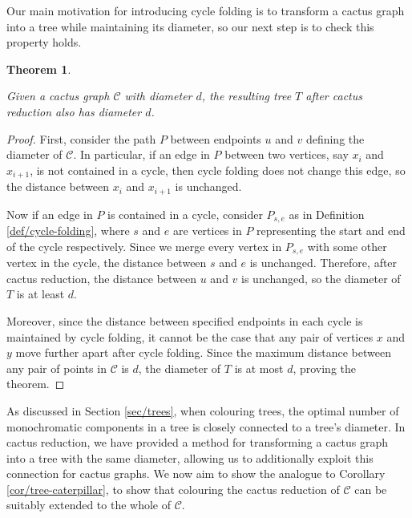\documentclass{mpaper}
\newtheorem{theorem}{Theorem}[section]
\begin{document}
Our main motivation for introducing cycle folding is to transform a cactus graph into a tree while maintaining its diameter, so our next step is to check this property holds.

\begin{theorem}
  \label{thm/cactus-reduction-diameter}

  Given a cactus graph $\mathcal{C}$ with diameter $d$, the resulting tree $T$ after cactus reduction also has diameter $d$.
\end{theorem}

\begin{proof}
  
First, consider the path $P$ between endpoints $u$ and $v$ defining the diameter of $\mathcal{C}$. In particular, if an edge in $P$ between two vertices, say $x_i$ and $x_{i+1}$, is not contained in a cycle, then cycle folding does not change this edge, so the distance between $x_i$ and $x_{i+1}$ is unchanged.

Now if an edge in $P$ is contained in a cycle, consider $P_{s,e}$ as in Definition \ref{def/cycle-folding}, where $s$ and $e$ are vertices in $P$ representing the start and end of the cycle respectively. Since we merge every vertex in $P_{s,e}$ with some other vertex in the cycle, the distance between $s$ and $e$ is unchanged. Therefore, after cactus reduction, the distance between $u$ and $v$ is unchanged, so the diameter of $T$ is at least $d$.

Moreover, since the distance between specified endpoints in each cycle is maintained by cycle folding, it cannot be the case that any pair of vertices $x$ and $y$ move further apart after cycle folding. Since the maximum distance between any pair of points in $\mathcal{C}$ is $d$, the diameter of $T$ is at most $d$, proving the theorem.
\end{proof}

As discussed in Section \ref{sec/trees}, when colouring trees, the optimal number of monochromatic components in a tree is closely connected to a tree's diameter. In cactus reduction, we have provided a method for transforming a cactus graph into a tree with the same diameter, allowing us to additionally exploit this connection for cactus graphs. We now aim to show the analogue to Corollary \ref{cor/tree-caterpillar}, to show that colouring the cactus reduction of $\mathcal{C}$ can be suitably extended to the whole of $\mathcal{C}$.
\end{document}
